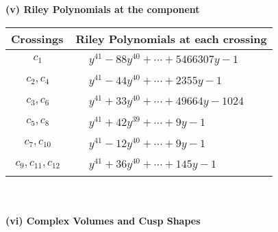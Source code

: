 \documentclass[1p]{elsarticle_modified}
\theoremstyle{definition}
\begin{document}
\newpage\renewcommand{\arraystretch}{1}
\flushleft \textbf{(v) Riley Polynomials at the component}\newline \\
\begin{tabular}{m{50pt}|m{274pt}}
Crossings & \hspace{64pt}Riley Polynomials at each crossing \\
\hline $$\begin{aligned}c_{1}\end{aligned}$$&$\begin{aligned}
&y^{41}-88 y^{40}+\cdots+5466307 y-1
\end{aligned}$\\
\hline $$\begin{aligned}c_{2},c_{4}\end{aligned}$$&$\begin{aligned}
&y^{41}-44 y^{40}+\cdots+2355 y-1
\end{aligned}$\\
\hline $$\begin{aligned}c_{3},c_{6}\end{aligned}$$&$\begin{aligned}
&y^{41}+33 y^{40}+\cdots+49664 y-1024
\end{aligned}$\\
\hline $$\begin{aligned}c_{5},c_{8}\end{aligned}$$&$\begin{aligned}
&y^{41}+42 y^{39}+\cdots+9 y-1
\end{aligned}$\\
\hline $$\begin{aligned}c_{7},c_{10}\end{aligned}$$&$\begin{aligned}
&y^{41}-12 y^{40}+\cdots+9 y-1
\end{aligned}$\\
\hline $$\begin{aligned}c_{9},c_{11},c_{12}\end{aligned}$$&$\begin{aligned}
&y^{41}+36 y^{40}+\cdots+145 y-1
\end{aligned}$\\
\hline
\end{tabular}\\~\\
\newpage\flushleft \textbf{(vi) Complex Volumes and Cusp Shapes}
\end{document}
